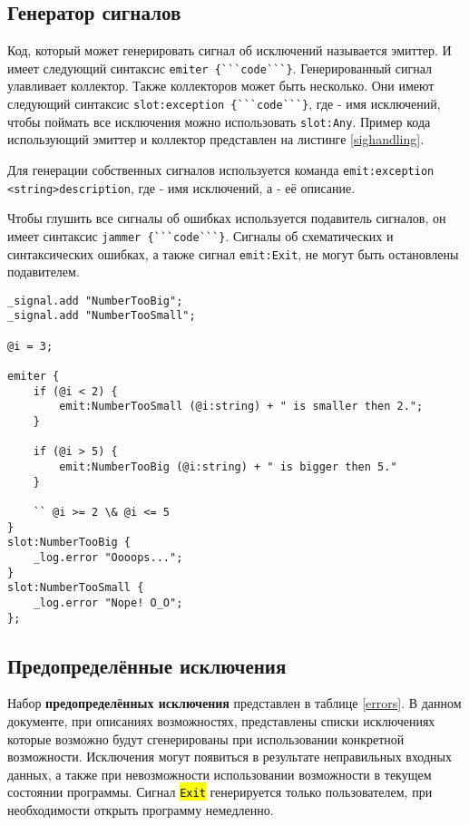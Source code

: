 \documentclass[a4paper, 14pt]{extarticle}
\newcommand{\ferror}[1]{\foreignlanguage{english}{\fontsize{11pt}{12pt}\tt{\sethlcolor{yellow}\hl{#1}}}}
\begin{document}
\subsection{Генератор сигналов}

Код, который может генерировать сигнал об исключений называется эмиттер. И имеет следующий синтаксис \lstinline|emiter {```code```}|. Генерированный сигнал улавливает коллектор. Также коллекторов может быть несколько. Они имеют следующий синтаксис \lstinline|slot:exception {```code```}|,
где  - имя исключений, чтобы поймать все исключения можно использовать \lstinline|slot:Any|. Пример кода использующий эмиттер и коллектор представлен на листинге \ref{sighandling}.

Для генерации собственных сигналов используется команда \lstinline|emit:exception <string>description|, где  - имя исключений, а  - её описание.

Чтобы глушить все сигналы об ошибках используется подавитель сигналов, он имеет синтаксис \lstinline|jammer {```code```}|. Сигналы об схематических и синтаксических ошибках, а также сигнал \lstinline|emit:Exit|, не могут быть остановлены подавителем.

\begin{lstlisting}[caption=Обработка инключении, label=sighandling]
_signal.add "NumberTooBig";
_signal.add "NumberTooSmall";

@i = 3;

emiter {
	if (@i < 2) {
		emit:NumberTooSmall (@i:string) + " is smaller then 2.";
	}
	
	if (@i > 5) {
		emit:NumberTooBig (@i:string) + " is bigger then 5."
	}

	`` @i >= 2 \& @i <= 5
}
slot:NumberTooBig {
	_log.error "Oooops...";
}
slot:NumberTooSmall {
	_log.error "Nope! O_O";
};
\end{lstlisting}

\subsection{Предопределённые исключения}

Набор {\bf предопределённых исключения} представлен в таблице \ref{errors}. В данном документе, при описаниях возможностях, представлены списки исключениях которые возможно будут сгенерированы при использовании конкретной возможности. Исключения могут появиться в результате неправильных входных данных, а также при невозможности использовании возможности в текущем состоянии программы. Сигнал \ferror{Exit} генерируется только пользователем, при необходимости открыть программу немедленно.
\end{document}
